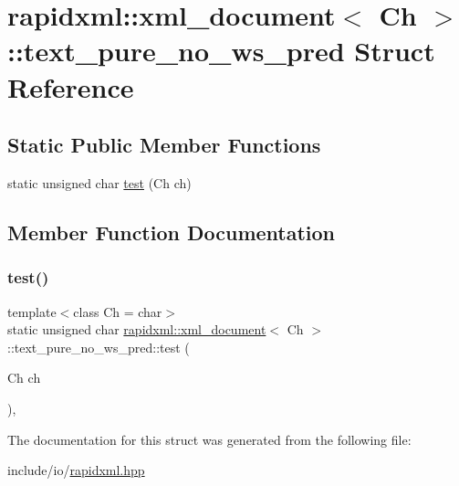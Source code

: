 \hypertarget{structrapidxml_1_1xml__document_1_1text__pure__no__ws__pred}{}\section{rapidxml\+::xml\+\_\+document$<$ Ch $>$\+::text\+\_\+pure\+\_\+no\+\_\+ws\+\_\+pred Struct Reference}
\label{structrapidxml_1_1xml__document_1_1text__pure__no__ws__pred}
\subsection*{Static Public Member Functions}
\begin{DoxyCompactItemize}
\item 
static unsigned char \mbox{\hyperlink{structrapidxml_1_1xml__document_1_1text__pure__no__ws__pred_ac06cdc0ea5db47462d2cb6b8a0334513}{test}} (Ch ch)
\end{DoxyCompactItemize}


\subsection{Member Function Documentation}
\mbox{\label{structrapidxml_1_1xml__document_1_1text__pure__no__ws__pred_ac06cdc0ea5db47462d2cb6b8a0334513}} 
\subsubsection{\texorpdfstring{test()}{test()}}
{\footnotesize\ttfamily template$<$class Ch = char$>$ \\
static unsigned char \mbox{\hyperlink{classrapidxml_1_1xml__document}{rapidxml\+::xml\+\_\+document}}$<$ Ch $>$\+::text\+\_\+pure\+\_\+no\+\_\+ws\+\_\+pred\+::test (\begin{DoxyParamCaption}\item[{Ch}]{ch }\end{DoxyParamCaption})\hspace{0.3cm}{\ttfamily [inline]}, {\ttfamily [static]}}



The documentation for this struct was generated from the following file\+:\begin{DoxyCompactItemize}
\item 
include/io/\mbox{\hyperlink{rapidxml_8hpp}{rapidxml.\+hpp}}\end{DoxyCompactItemize}
